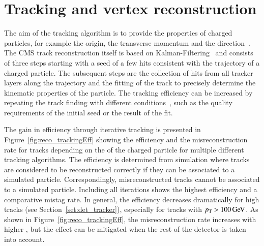 \section{Tracking and vertex reconstruction}
\label{sec:SimReco_Track}


The aim of the tracking algorithm is to provide the properties of charged particles, for example the origin, the transverse momentum and the direction~\cite{Sirunyan:2017ulk}.
The CMS track reconstruction itself is based on Kalman-Filtering~\cite{Adam:934067} and consists of three steps starting with a seed of a few hits consistent with the trajectory of a charged particle.
The subsequent steps are the collection of hits from all tracker layers along the trajectory and the fitting of the track to precisely determine the kinematic properties of the particle.
The tracking efficiency can be increased by repeating the track finding with different conditions~\cite{1748-0221-9-10-P10009}, such as the quality requirements of the initial seed or the result of the fit.

The gain in efficiency through iterative tracking is presented in Figure~\ref{fig:reco_trackingEff} showing the efficiency and the misreconstruction rate for tracks depending on the \pt of the charged particle for 
multiple different tracking algorithms. The efficiency is determined from simulation where tracks are considered to be reconstructed correctly if they can be associated to a simulated particle. Correspondingly, 
misreconstructed tracks cannot be associated to a simulated particle. 
Including all iterations shows the highest efficiency and a comparative mistag rate. In general, the efficiency decreases dramatically for high \pt tracks (see Section~\ref{set:det_tracker}), especially for tracks with $p_{\mathrm{T}} > 100 \,\text{Ge\hspace{-.08em}V}$.
As shown in Figure~\ref{fig:reco_trackingEff}, the misreconstruction rate increases with higher \pt, but the effect can be mitigated when the rest of the detector is taken into account.

